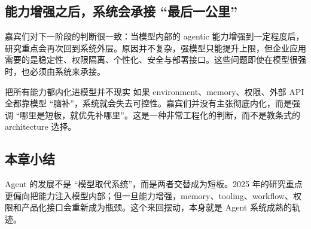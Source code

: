\subsection{能力增强之后，系统会承接 ``最后一公里''}
嘉宾们对下一阶段的判断很一致：当模型内部的 agentic 能力增强到一定程度后，研究重点会再次回到系统外层。原因并不复杂，强模型只能提升上限，但企业应用需要的是稳定性、权限隔离、个性化、安全与部署接口。这些问题即使在模型很强时，也必须由系统来承接。

\begin{warningbox}{把所有能力都内化进模型并不现实}
如果 environment、memory、权限、外部 API 全都靠模型 ``脑补''，系统就会失去可控性。嘉宾们并没有主张彻底内化，而是强调 ``哪里是短板，就优先补哪里''。这是一种非常工程化的判断，而不是教条式的 architecture 选择。
\end{warningbox}

\subsection{本章小结}
Agent 的发展不是 ``模型取代系统''，而是两者交替成为短板。2025 年的研究重点更偏向把能力注入模型内部；但一旦能力增强，memory、tooling、workflow、权限和产品化接口会重新成为瓶颈。这个来回摆动，本身就是 Agent 系统成熟的轨迹。

